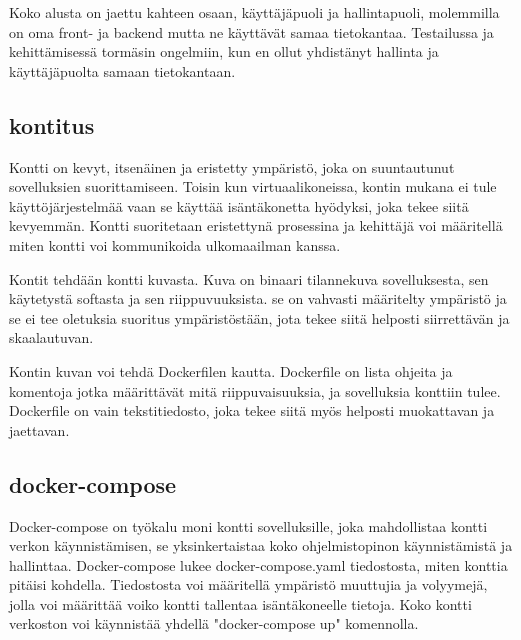 


Koko alusta on jaettu kahteen osaan, käyttäjäpuoli ja hallintapuoli, molemmilla on oma front- ja backend mutta ne käyttävät samaa tietokantaa.
Testailussa ja kehittämisessä tormäsin ongelmiin, kun en ollut yhdistänyt hallinta ja käyttäjäpuolta samaan tietokantaan.




\subsection*{kontitus}




Kontti on kevyt, itsenäinen ja eristetty ympäristö, joka on suuntautunut sovelluksien suorittamiseen.
Toisin kun virtuaalikoneissa, kontin mukana ei tule käyttöjärjestelmää vaan se käyttää isäntäkonetta hyödyksi, joka tekee siitä kevyemmän.
Kontti suoritetaan eristettynä prosessina ja kehittäjä voi määritellä miten kontti voi kommunikoida ulkomaailman kanssa.
\medskip

Kontit tehdään kontti kuvasta.
Kuva on binaari tilannekuva sovelluksesta, sen käytetystä softasta ja sen riippuvuuksista.
se on vahvasti määritelty ympäristö ja se ei tee oletuksia suoritus ympäristöstään, jota tekee siitä helposti siirrettävän ja skaalautuvan.
\medskip

Kontin kuvan voi tehdä Dockerfilen kautta. Dockerfile on lista ohjeita ja komentoja jotka määrittävät mitä riippuvaisuuksia, ja sovelluksia konttiin tulee.
Dockerfile on vain tekstitiedosto, joka tekee siitä myös helposti muokattavan ja jaettavan.

\medskip






\subsection*{docker-compose}


Docker-compose on työkalu moni kontti sovelluksille, joka mahdollistaa kontti verkon käynnistämisen, se yksinkertaistaa koko ohjelmistopinon käynnistämistä ja hallinttaa.
Docker-compose lukee docker-compose.yaml tiedostosta, miten konttia pitäisi kohdella.
Tiedostosta voi määritellä ympäristö muuttujia ja volyymejä, jolla voi määrittää voiko kontti tallentaa isäntäkoneelle tietoja.
Koko kontti verkoston voi käynnistää yhdellä "docker-compose up"{} komennolla.


